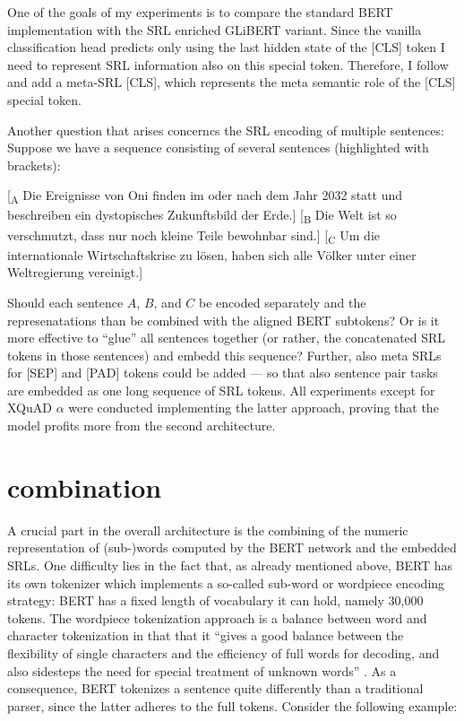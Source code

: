 One of the goals of my experiments is to compare the standard BERT implementation with the SRL
enriched GLiBERT variant. Since the vanilla classification head predicts only using the last
hidden state of the [CLS] token I need to represent SRL information also on this special
token. Therefore, I follow \cite{zhang2019semantics} and add a meta-SRL [CLS], which represents
the meta semantic role of the [CLS] special token.

Another question that arises concerncs the SRL encoding of multiple sentences:
Suppose we have a sequence consisting of several sentences (highlighted with brackets):

\begin{examples}
  \item {[}\textsubscript{A} Die Ereignisse von Oni finden im oder nach dem Jahr 2032 statt und beschreiben ein dystopisches Zukunftsbild der Erde.] [\textsubscript{B} Die Welt ist so verschmutzt, dass nur noch kleine Teile bewohnbar sind.] [\textsubscript{C} Um die internationale Wirtschaftskrise zu lösen, haben sich alle Völker unter einer Weltregierung vereinigt.]
\end{examples}

Should each sentence  $A$, $B$, and $C$ be encoded separately and the represenatations than
be combined with the aligned BERT subtokens? Or is it more
effective to ``glue'' all sentences together (or rather, the concatenated SRL tokens in those
sentences) and embedd this sequence? Further, also meta SRLs for [SEP] and [PAD] tokens could be added ---
so that also sentence pair tasks are embedded as one long sequence of SRL tokens. All experiments
except for XQuAD $\alpha$ were conducted implementing the latter approach, proving that the model
profits more from the second architecture.



\section{combination}

A crucial part in the overall architecture is the combining of the numeric representation
of (sub-)words computed by the BERT network and the embedded SRLs. One difficulty lies in
the fact that, as already mentioned above, BERT has its own tokenizer which implements
a so-called sub-word or wordpiece \cite{wu2016google} encoding strategy: BERT has a
fixed length of vocabulary it can hold, namely 30,000 tokens. The wordpiece tokenization
approach is a balance between word and character tokenization in that that it ``gives
a good balance between the flexibility of single characters and the efficiency of full
words for decoding, and also sidesteps the need for special treatment of unknown words''
\citep[p.~2]{wu2016google}. As a consequence, BERT tokenizes a sentence quite differently
than a traditional parser, since the latter adheres to the full tokens. Consider the
following example:


